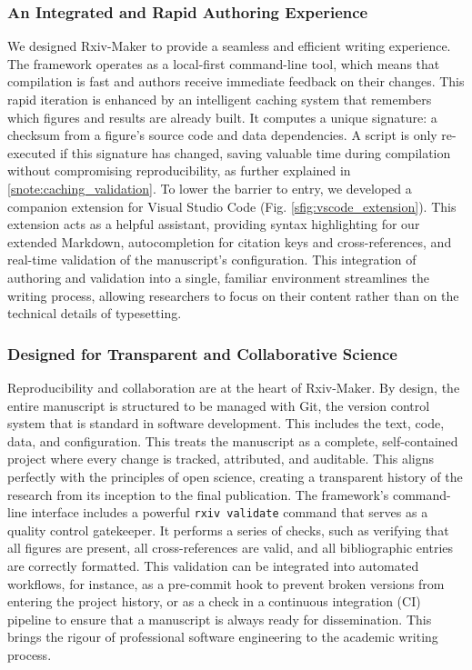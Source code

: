 \documentclass[times, twoside]{rxiv_maker_style}
\begin{document}
\subsubsection{An Integrated and Rapid Authoring Experience}
We designed Rxiv-Maker to provide a seamless and efficient writing experience. The framework operates as a local-first command-line tool, which means that compilation is fast and authors receive immediate feedback on their changes. This rapid iteration is enhanced by an intelligent caching system that remembers which figures and results are already built. It computes a unique signature: a checksum from a figure's source code and data dependencies. A script is only re-executed if this signature has changed, saving valuable time during compilation without compromising reproducibility, as further explained in \ref{snote:caching_validation}.
To lower the barrier to entry, we developed a companion extension for Visual Studio Code (Fig. \ref{sfig:vscode_extension}). This extension acts as a helpful assistant, providing syntax highlighting for our extended Markdown, autocompletion for citation keys and cross-references, and real-time validation of the manuscript's configuration. This integration of authoring and validation into a single, familiar environment streamlines the writing process, allowing researchers to focus on their content rather than on the technical details of typesetting.

\subsubsection{Designed for Transparent and Collaborative Science}
Reproducibility and collaboration are at the heart of Rxiv-Maker. By design, the entire manuscript is structured to be managed with Git, the version control system that is standard in software development. This includes the text, code, data, and configuration. This treats the manuscript as a complete, self-contained project where every change is tracked, attributed, and auditable. This aligns perfectly with the principles of open science, creating a transparent history of the research from its inception to the final publication.
The framework's command-line interface includes a powerful \texttt{rxiv validate} command that serves as a quality control gatekeeper. It performs a series of checks, such as verifying that all figures are present, all cross-references are valid, and all bibliographic entries are correctly formatted. This validation can be integrated into automated workflows, for instance, as a pre-commit hook to prevent broken versions from entering the project history, or as a check in a continuous integration (CI) pipeline to ensure that a manuscript is always ready for dissemination. This brings the rigour of professional software engineering to the academic writing process.
\end{document}
